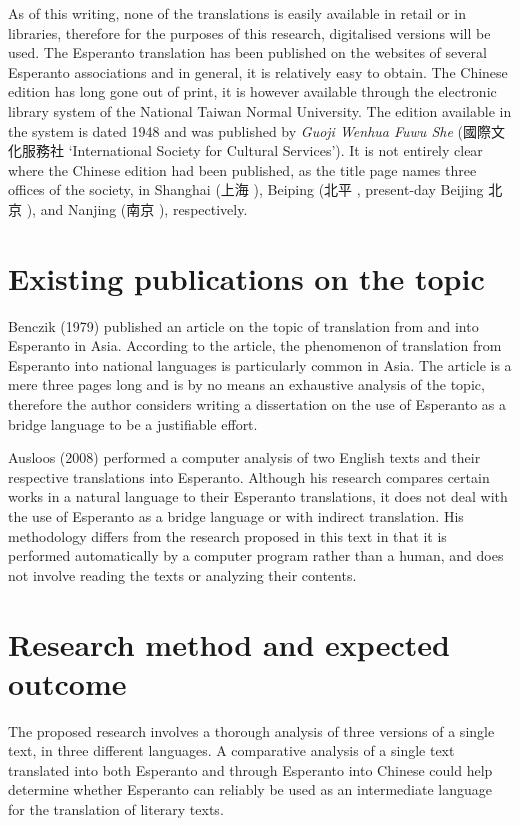 As of this writing, none of the translations is easily available in retail or in libraries, therefore for the purposes of this research, digitalised versions will be used.
The Esperanto translation has been published on the websites of several Esperanto associations and in general, it is relatively easy to obtain.
The Chinese edition has long gone out of print, it is however available through the electronic library system of the National Taiwan Normal University.
The edition available in the system is dated 1948 and was published by \textit{Guoji Wenhua Fuwu She} (國際文化服務社  `International Society for Cultural Services').
It is not entirely clear where the Chinese edition had been published, as the title page names three offices of the society, in Shanghai (上海 ), Beiping (北平 , present-day Beijing 北京 ), and Nanjing (南京 ), respectively.

\section{Existing publications on the topic}
Benczik (1979) published an article on the topic of translation from and into Esperanto in Asia.
According to the article, the phenomenon of translation from Esperanto into national languages is particularly common in Asia.
The article is a mere three pages long and is by no means an exhaustive analysis of the topic, therefore the author considers writing a dissertation on the use of Esperanto as a bridge language to be a justifiable effort.

Ausloos (2008) performed a computer analysis of two English texts and their respective translations into Esperanto.
Although his research compares certain works in a natural language to their Esperanto translations, it does not deal with the use of Esperanto as a bridge language or with indirect translation.
His methodology differs from the research proposed in this text in that it is performed automatically by a computer program rather than a human, and does not involve reading the texts or analyzing their contents.

\section{Research method and expected outcome}
The proposed research involves a thorough analysis of three versions of a single text, in three different languages.
A comparative analysis of a single text translated into both Esperanto and through Esperanto into Chinese could help determine whether Esperanto can reliably be used as an intermediate language for the translation of literary texts.

